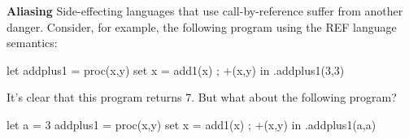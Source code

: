 \begin{minipage}[t]{\sw}
\slidenumber
\LARGE
{\bf Aliasing}\exx
Side-effecting languages that use call-by-reference
suffer from another danger.
Consider, for example, the following program using the REF language semantics:
\begin{qv}
let
  addplus1 = proc(x,y) {set x = add1(x) ; +(x,y)}
in
  .addplus1(3,3)
\end{qv}
It's clear that this program returns 7.
But what about the following program?
\begin{qv}
let
  a = 3
  addplus1 = proc(x,y) {set x = add1(x) ; +(x,y)}
in
  .addplus1(a,a)
\end{qv}
\end{minipage}
\clearpage
